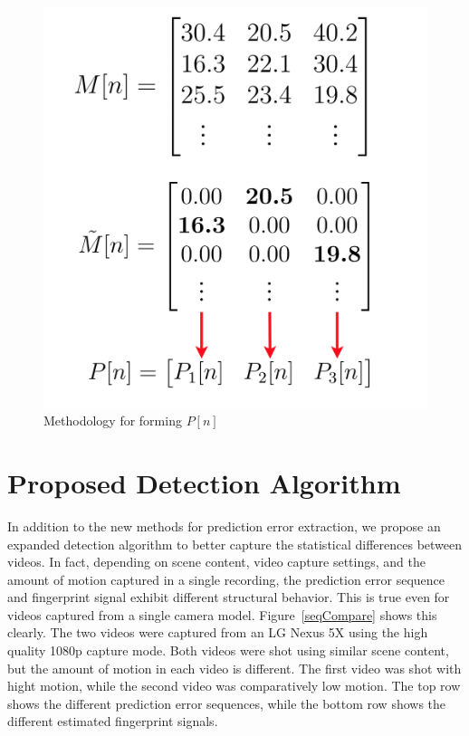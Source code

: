 \begin{figure}[htbp]
\centerline{\includegraphics[width=0.55\linewidth]{ProposedApproach/formation_p_vector.png}}
\caption{Methodology for forming $P[n]$}
\label{formp}
\end{figure}

\section{Proposed Detection Algorithm}

In addition to the new methods for prediction error extraction, we propose an expanded detection algorithm to better capture the statistical differences between videos. In fact, depending on scene content, video capture settings, and the amount of motion captured in a single recording, the prediction error sequence and fingerprint signal exhibit different structural behavior. This is true even for videos captured from a single camera model. Figure~\ref{seqCompare} shows this clearly. The two videos were captured from an LG Nexus 5X using the high quality 1080p capture mode. Both videos were shot using similar scene content, but the amount of motion in each video is different. The first video was shot with hight motion, while the second video was comparatively low motion. The top row shows the different prediction error sequences, while the bottom row shows the different estimated fingerprint signals.

